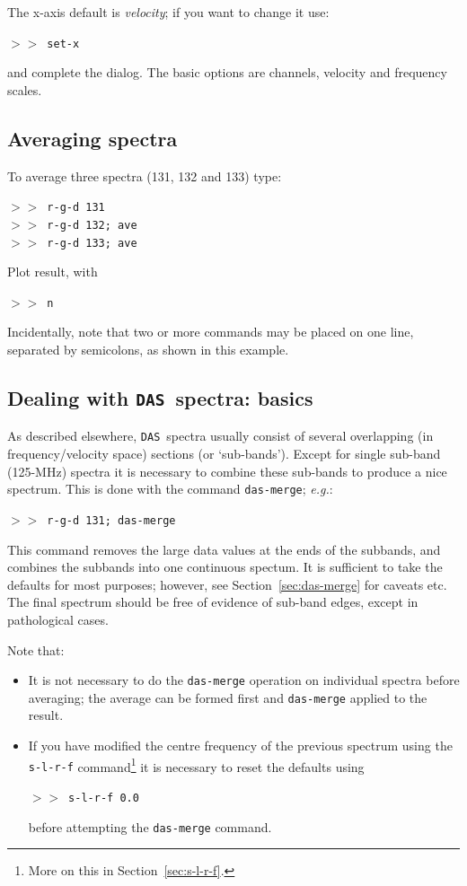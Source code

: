 \documentclass[11pt,twoside]{article}
\newcommand{\eg}{{\it e.g.}}
\newcommand{\SPECX}{{\tt SPECX}}
\newcommand{\das}{{\tt DAS}}
\newcommand{\margnote}[1]
{\marginpar{({\it{\ref{#1}}})}}
\newcommand{\SP}{{$>\!>$}}
\begin{document}
The x-axis default is {\it{velocity}}; if you want to change it
use\margnote{sec:set-x}:

\SP\ {\tt{set-x}}

and complete the dialog. The basic options are channels, velocity and
frequency scales.


\subsection{Averaging spectra}
To average\margnote{sec:specx_8.2} three spectra (131, 132 and 133) type:

\SP\ {\tt{r-g-d 131}}\\
\SP\ {\tt{r-g-d 132; ave}}\\
\SP\ {\tt{r-g-d 133; ave}}

Plot result, with

\SP\ {\tt{n}}

Incidentally, note that two or more commands may be placed on one
line, separated by semicolons, as shown in this example.

\subsection{Dealing with \das\ spectra: basics}
\label{sec:subbands}
As described elsewhere,
\das\ spectra usually
\margnote{sec:das-merge}
consist of several overlapping (in frequency/velocity space) sections
(or `sub-bands'). Except for single sub-band (125-MHz) spectra it is
necessary to combine these sub-bands to produce a nice spectrum. This
is done with the command {\tt{das-merge}}; \eg :

\SP\ {\tt r-g-d 131; das-merge}

This command removes the large data values at the ends
of the subbands, and combines the subbands into one continuous
spectum.  It is sufficient to take the defaults for most purposes;
however, see Section~\ref{sec:das-merge} for caveats etc.  The final
spectrum should be free of evidence of sub-band edges, except in
pathological cases.


\reversemarginpar
Note that:
\begin{itemize}
\item
It is not necessary to do the {\tt das-merge} operation on individual
spectra before averaging; the average can be formed first and
{\tt{das-merge}} applied to the result.
\item
If you have modified the centre frequency of the previous spectrum
\margnote{sec:s-l-r-f}
using the {\tt{s-l-r-f}} command\footnote{More on this in
Section~\ref{sec:s-l-r-f}.} it is necessary to reset the defaults
using

\SP\ {\tt{s-l-r-f 0.0}}

before attempting the {\tt{das-merge}} command.
\end{itemize}
\end{document}
